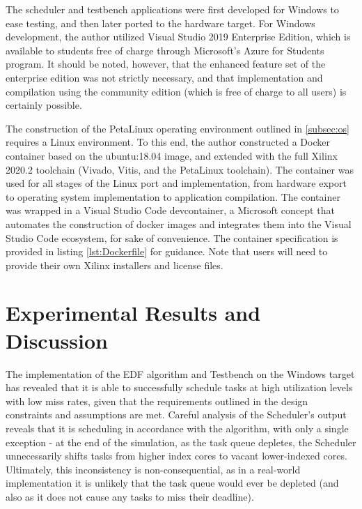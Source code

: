 The scheduler and testbench applications were first developed for Windows to ease testing, and then later ported to the hardware target. For Windows development, the author utilized Visual Studio 2019 Enterprise Edition, which is available to students free of charge through Microsoft's Azure for Students program. It should be noted, however, that the enhanced feature set of the enterprise edition was not strictly necessary, and that implementation and compilation using the community edition (which is free of charge to all users) is certainly possible.

The construction of the PetaLinux operating environment outlined in \ref{subsec:os} requires a Linux environment. To this end, the author constructed a Docker container based on the ubuntu:18.04 image, and extended with the full Xilinx 2020.2 toolchain (Vivado, Vitis, and the PetaLinux toolchain). The container was used for all stages of the Linux port and implementation, from hardware export to operating system implementation to application compilation. The container was wrapped in a Visual Studio Code devcontainer, a Microsoft concept that automates the construction of docker images and integrates them into the Visual Studio Code ecosystem, for sake of convenience. The container specification is provided in listing \ref{lst:Dockerfile} for guidance. Note that users will need to provide their own Xilinx installers and license files.

\section{Experimental Results and Discussion}\label{sec:findings}
The implementation of the EDF algorithm and Testbench on the Windows target has revealed that it is able to successfully schedule tasks at high utilization levels with low miss rates, given that the requirements outlined in the design constraints and assumptions are met. Careful analysis of the Scheduler's output reveals that it is scheduling in accordance with the algorithm, with only a single exception - at the end of the simulation, as the task queue depletes, the Scheduler unnecessarily shifts tasks from higher index cores to vacant lower-indexed cores. Ultimately, this inconsistency is non-consequential, as in a real-world implementation it is unlikely that the task queue would ever be depleted (and also as it does not cause any tasks to miss their deadline).

